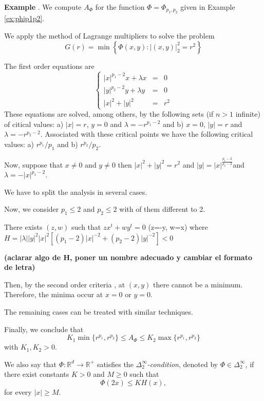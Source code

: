 \documentclass[twoside]{article}
\theoremstyle{remark}
\renewcommand{\leq}{\leqslant}
\renewcommand{\geq}{\geqslant}
\newcounter{example}
\newenvironment{example}{\noindent\textbf{Example \arabic{example}}.}{\addtocounter{example}{1}}
\begin{document}
\begin{example} We compute $A_{\Phi}$ for the function $\Phi=\Phi_{p_1,p_2}$ given in Example \eqref{ex:phip1p2}.

We apply the method of Lagrange multipliers to solve the  problem
\[
G(r)=\min\left\{\Phi(x,y):|(x,y)|_2^2=r^2\right\}\]

The first order equations are
\[
\left
\{
\begin{array}{ccc}
|x|^{p_1-2}x+ \lambda x&=&0
\\
|y|^{p_2-2}y+\lambda y&=&0
\\
|x|^2+|y|^2&=&r^2
\end{array}
\right.
\]
These equations are solved, among others, by the following sets (if $n>1$ infinite) of citical values: 
a) $|x|=r$, $y=0$ and $\lambda=-r^{p_1-2}$ and b) $x=0$, $|y|=r$ and $\lambda=-r^{p_2-2}$. 
Associated with these critical points we have the following critical values: a) $r^{p_1}/p_1$ and b) $r^{p_2}/p_2$.

Now, suppose that  $x\neq 0$ and $y \neq 0$ then $|x|^2+|y|^2=r^2$ and $|y|=|x|^{\frac{p_1-2}{p_2-2}}$and $\lambda=-|x|^{p_1-2}$.

We have to split the analysis in several cases. 

Now, we consider $p_1\leq 2$ and $p_2\leq 2$ with of them different to 2.

There exists $(z,w)$ such that $zx^t+wy^t=0$ (z=-y, w=x) where 
$H=|\lambda||y|^2|x|^2[(p_1-2)|x|^{-2}+(p_2-2)|y|^{-2}]<0$
 
{\bf (aclarar algo de H, poner un nombre adecuado y cambiar el formato de letra)}

Then, by the second order criteria \cite[Thm....]{Ye}, 
at $(x,y)$ there cannot be a minimum. Therefore, the minima occur at $x=0$ or $y=0$.

The remaining cases can be treated with similar techniques. 

Finally, we conclude that 
\[
K_1\min\{r^{p_1}, r^{p_2}\}\leq A_{\Phi}\leq K_2\max\{r^{p_1}, r^{p_2}\}
\]
with $K_1,K_2>0$.
\end{example}





We also say that $\Phi:\mathbb{R}^d\rightarrow \mathbb{R}^+$ satisfies the  \emph{$\Delta_2^{\infty}$-condition}, denoted by $\Phi \in \Delta_2^{\infty}$,
if there exist  constants $K>0$ and  $M\geq 0$ such that
\begin{equation}\label{delta2defi}\Phi(2x)\leq KH(x),
\end{equation}
for every $|x|\geq M$.
\end{document}

